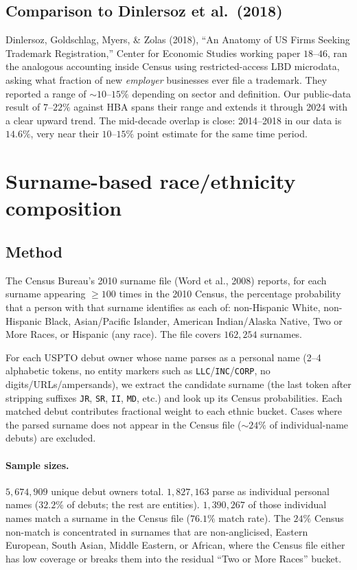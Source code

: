 \documentclass[11pt]{article}
\begin{document}
\subsection*{Comparison to Dinlersoz et al.\ (2018)}

Dinlersoz, Goldschlag, Myers, \& Zolas (2018), ``An Anatomy of US
Firms Seeking Trademark Registration,'' Center for Economic Studies
working paper $18$--$46$, ran the analogous accounting inside Census
using restricted-access LBD microdata, asking what fraction of new
\emph{employer} businesses ever file a trademark. They reported a
range of $\sim 10$--$15\%$ depending on sector and definition. Our
public-data result of $7$--$22\%$ against HBA spans their range and
extends it through 2024 with a clear upward trend. The mid-decade
overlap is close: 2014--2018 in our data is $14.6\%$, very near
their $10$--$15\%$ point estimate for the same time period.

\section{Surname-based race/ethnicity composition}

\subsection*{Method}
The Census Bureau's 2010 surname file (Word et al., 2008) reports,
for each surname appearing $\geq 100$ times in the 2010 Census, the
percentage probability that a person with that surname identifies as
each of: non-Hispanic White, non-Hispanic Black, Asian/Pacific
Islander, American Indian/Alaska Native, Two or More Races, or
Hispanic (any race). The file covers $162{,}254$ surnames.

For each USPTO debut owner whose name parses as a personal name
(2--4 alphabetic tokens, no entity markers such as
\texttt{LLC}/\texttt{INC}/\texttt{CORP}, no digits/URLs/ampersands),
we extract the candidate surname (the last token after stripping
suffixes \texttt{JR}, \texttt{SR}, \texttt{II}, \texttt{MD}, etc.)
and look up its Census probabilities. Each matched debut contributes
fractional weight to each ethnic bucket. Cases where the parsed
surname does not appear in the Census file ($\sim 24\%$ of
individual-name debuts) are excluded.

\paragraph{Sample sizes.}
$5{,}674{,}909$ unique debut owners total. $1{,}827{,}163$ parse as
individual personal names ($32.2\%$ of debuts; the rest are entities).
$1{,}390{,}267$ of those individual names match a surname in the
Census file ($76.1\%$ match rate). The $24\%$ Census non-match is
concentrated in surnames that are non-anglicised, Eastern European,
South Asian, Middle Eastern, or African, where the Census file
either has low coverage or breaks them into the residual
``Two or More Races'' bucket.
\end{document}
